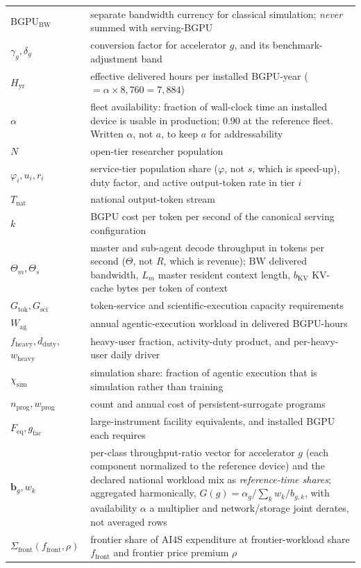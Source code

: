 \begin{longtable}{p{26mm}p{112mm}}
BGPU$_{\mathrm{BW}}$ & separate bandwidth currency for classical simulation; \emph{never} summed with serving-BGPU \\
$\gamma_g, \delta_g$ & conversion factor for accelerator $g$, and its benchmark-adjustment band \\
$H_{\mathrm{yr}}$ & effective delivered hours per installed BGPU-year ($=\alpha\times 8{,}760 = 7{,}884$) \\
$\alpha$ & fleet availability: fraction of wall-clock time an installed device is usable in production; 0.90 at the reference fleet. Written $\alpha$, not $a$, to keep $a$ for addressability \\
$N$ & open-tier researcher population \\
$\varphi_i, u_i, r_i$ & service-tier population share ($\varphi$, not $s$, which is speed-up), duty factor, and active output-token rate in tier $i$ \\
$T_{\mathrm{nat}}$ & national output-token stream \\
$k$ & BGPU cost per token per second of the canonical serving configuration \\
$\Theta_m, \Theta_s$ & master and sub-agent decode throughput in tokens per second ($\Theta$, not $R$, which is revenue); $\mathrm{BW}$ delivered bandwidth, $L_m$ master resident context length, $b_{\mathrm{KV}}$ KV-cache bytes per token of context \\
$G_{\mathrm{tok}}, G_{\mathrm{sci}}$ & token-service and scientific-execution capacity requirements \\
$W_{\mathrm{ag}}$ & annual agentic-execution workload in delivered BGPU-hours \\
$f_{\mathrm{heavy}}, d_{\mathrm{duty}},$ \newline $w_{\mathrm{heavy}}$ & heavy-user fraction, activity-duty product, and per-heavy-user daily driver \\
$\chi_{\mathrm{sim}}$ & simulation share: fraction of agentic execution that is simulation rather than training \\
$n_{\mathrm{prog}}, w_{\mathrm{prog}}$ & count and annual cost of persistent-surrogate programs \\
$F_{\mathrm{eq}}, g_{\mathrm{fac}}$ & large-instrument facility equivalents, and installed BGPU each requires \\
$\mathbf{b}_g, w_k$ & per-class throughput-ratio vector for accelerator $g$ (each component normalized to the reference device) and the declared national workload mix as \emph{reference-time shares}; aggregated harmonically, $G(g)=\alpha_g/\sum_k w_k/b_{g,k}$, with availability $\alpha$ a multiplier and network/storage joint derates, not averaged rows \\
$\Sigma_{\mathrm{front}}(f_{\mathrm{front}},\rho)$ & frontier share of AI4S expenditure at frontier-workload share $f_{\mathrm{front}}$ and frontier price premium $\rho$ \\
\bottomrule
\end{longtable}

